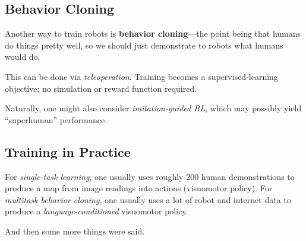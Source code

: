 \subsection{Behavior Cloning}

Another way to train robots is \textbf{behavior cloning}---the point being
that humans do things pretty well, so we should just
demonstrate to robots what humans would do.

This can be done via \emph{teleoperation}.
Training becomes a supervised-learning objective;
no simulation or reward function required.

Naturally, one might also consider \emph{imitation-guided RL},
which may possibly yield ``superhuman'' performance.

\subsection{Training in Practice}

For \emph{single-task learning},
one usually uses roughly 200 human demonstrations
to produce a map from image readings into actions (visuomotor policy).
For \emph{multitask behavior cloning},
one usually uses a lot of robot and internet data
to produce a \emph{language-conditioned} visuomotor policy.

\begin{remark}
    And then some more things were said.
\end{remark}

